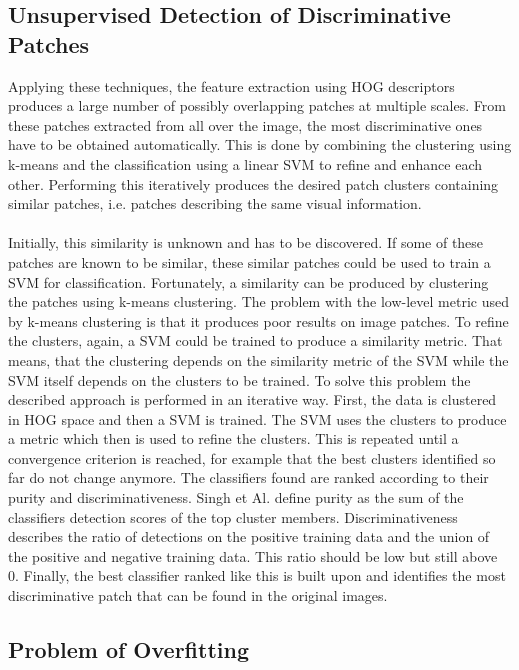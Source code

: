 \subsection{Unsupervised Detection of Discriminative Patches}

Applying these techniques, the feature extraction using HOG descriptors produces a large number of possibly overlapping patches at multiple scales. From these patches extracted from all over the image, the most discriminative ones have to be obtained automatically. This is done by combining the clustering using k-means and the classification using a linear SVM to refine and enhance each other. Performing this iteratively produces the desired patch clusters containing similar patches, i.e. patches describing the same visual information. 
\\
\\
Initially, this similarity is unknown and has to be discovered. If some of these patches are known to be similar, these similar patches could be used to train a SVM for classification. Fortunately, a similarity can be produced by clustering the patches using k-means clustering. The problem with the low-level metric used by k-means clustering is that it produces poor results on image patches. To refine the clusters, again, a SVM could be trained to produce a similarity metric. That means, that the clustering depends on the similarity metric of the SVM while the SVM itself depends on the clusters to be trained. To solve this problem the described approach is performed in an iterative way. First, the data is clustered in HOG space and then a SVM is trained. The SVM uses the clusters to produce a metric which then is used to refine the clusters. This is repeated until a convergence criterion is reached, for example that the best clusters identified so far do not change anymore. The classifiers found are ranked according to their purity and discriminativeness. Singh et Al. \cite{Singh2012DiscPat} define purity as the sum of the classifiers detection scores of the top cluster members. Discriminativeness describes the ratio of detections on the positive training data and the union of the positive and negative training data. This ratio should be low but still above 0. Finally, the best classifier ranked like this is built upon and identifies the most discriminative patch that can be found in the original images.

\subsection{Problem of Overfitting}

